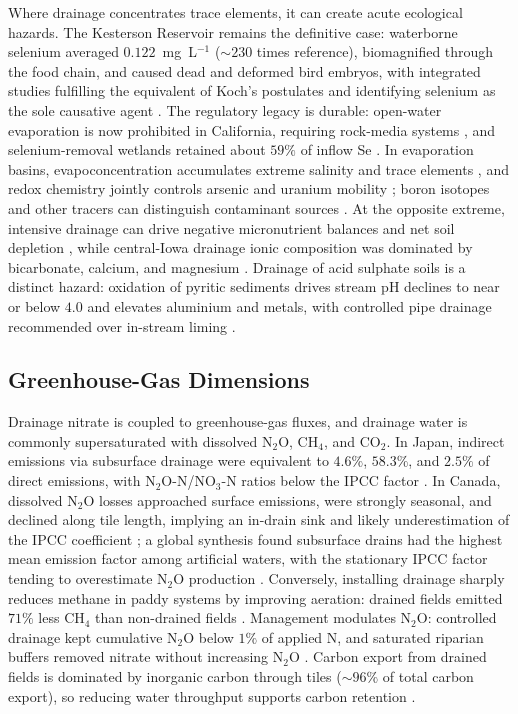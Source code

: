 \documentclass[11pt]{article}
\begin{document}
Where drainage concentrates trace elements, it can create acute ecological
hazards. The Kesterson Reservoir remains the definitive case: waterborne selenium
averaged $0.122$~mg~L$^{-1}$ ($\sim230$ times reference), biomagnified through the
food chain, and caused dead and deformed bird embryos, with integrated studies
fulfilling the equivalent of Koch's postulates and identifying selenium as the
sole causative agent \parencite{SAIKI1987,Ohlendorf2002,BENSON1993}. The
regulatory legacy is durable: open-water evaporation is now prohibited in
California, requiring rock-media systems \parencite{Ayars2014,BRADFORD1991}, and
selenium-removal wetlands retained about $59\%$ of inflow Se \parencite{Gao2003}.
In evaporation basins, evapoconcentration accumulates extreme salinity and trace
elements \parencite{WESTCOT1988}, and redox chemistry jointly controls arsenic
and uranium mobility \parencite{Ryu2010,Gao2007,Duff1997}; boron isotopes and
other tracers can distinguish contaminant sources
\parencite{Tayfur2010,Komor1997,Zhou2023}. At the opposite extreme, intensive
drainage can drive negative micronutrient balances and net soil depletion
\parencite{Gul2013}, while central-Iowa drainage ionic composition was dominated
by bicarbonate, calcium, and magnesium \parencite{Zimmerman2017b}. Drainage of
acid sulphate soils is a distinct hazard: oxidation of pyritic sediments drives
stream pH declines to near or below $4.0$ and elevates aluminium and metals, with
controlled pipe drainage recommended over in-stream liming
\parencite{Osterholm2005,Åström2005,Virtanen2017,Salo2023}.

\subsection{Greenhouse-Gas Dimensions}

Drainage nitrate is coupled to greenhouse-gas fluxes, and drainage water is
commonly supersaturated with dissolved N$_2$O, CH$_4$, and CO$_2$. In Japan,
indirect emissions via subsurface drainage were equivalent to $4.6\%$, $58.3\%$,
and $2.5\%$ of direct emissions, with N$_2$O-N/NO$_3$-N ratios below the IPCC
factor \parencite{Sawamoto2003,Minamikawa2010,Minamikawa2013}. In Canada,
dissolved N$_2$O losses approached surface emissions, were strongly seasonal, and
declined along tile length, implying an in-drain sink and likely underestimation
of the IPCC coefficient \parencite{Burton2024}; a global synthesis found
subsurface drains had the highest mean emission factor among artificial waters,
with the stationary IPCC factor tending to overestimate N$_2$O production
\parencite{Webb2021}. Conversely, installing drainage sharply reduces methane in
paddy systems by improving aeration: drained fields emitted $71\%$ less CH$_4$
than non-drained fields \parencite{Shiratori2007,Furukawa2008}. Management
modulates N$_2$O: controlled drainage kept cumulative N$_2$O below $1\%$ of
applied N, and saturated riparian buffers removed nitrate without increasing
N$_2$O \parencite{Smith2019,Davis2019,Nash2015e,Carstensen2021}. Carbon export
from drained fields is dominated by inorganic carbon through tiles ($\sim96\%$ of
total carbon export), so reducing water throughput supports carbon retention
\parencite{Schilling2023,Driscoll2025}.
\end{document}
